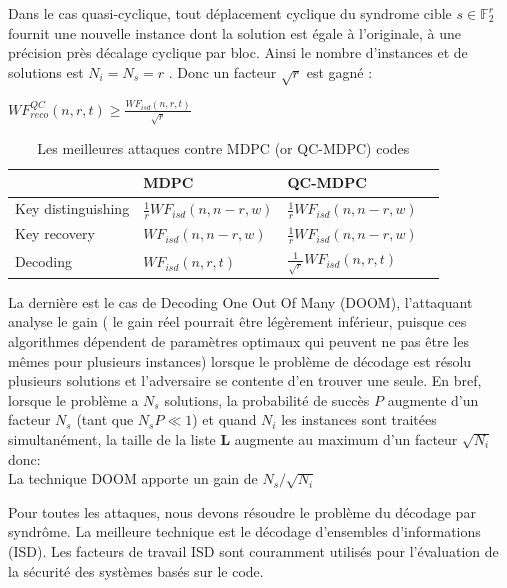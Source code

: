 \documentclass[12pt,openany]{report}
\begin{document}
\begin{itemize}
Dans le cas quasi-cyclique, tout déplacement cyclique du syndrome cible  $  s \in \mathbb{F}_{2}^{r}  $
fournit une nouvelle instance dont la solution est égale à l'originale, à une précision près
décalage cyclique par bloc. Ainsi le nombre d'instances et de solutions est
$N_i = N_s = r $ . Donc un facteur $ \sqrt{r} $ est gagné :
\begin{center}

{\large

$ WF_{reco}^{QC}(n,r,t)\geq \frac{WF_{isd}(n,r,t)}{ \sqrt{r}}  $}
\hspace{0.3cm}
\end{center}
\begin{table}
\centering
\begin{tabular}{|R{5cm}||C{4cm}|L{4cm}|L{4.5cm}|}
\hline  & MDPC &  QC-MDPC \\
\hline  Key distinguishing  &$ \frac{1}{r}WF_{isd}(n,n-r,w) $ & $\frac{1}{r}WF_{isd}(n,n-r,w) $  \\
\hline 
Key recovery  &$ WF_{isd}(n,n-r,w) $ & $\frac{1}{r}WF_{isd}(n,n-r,w) $  \\
Decoding  &$ WF_{isd}(n,r,t) $ & $\frac{1}{\sqrt{r}}WF_{isd}(n,r,t) $  \\
\hline

\end{tabular}
\caption{Les meilleures attaques contre MDPC (or QC-MDPC) codes }
\label{tab5}
\end{table}

\end{itemize}
\hspace{1.2cm}
La dernière est le cas de Decoding One Out Of Many (DOOM), l'attaquant analyse le gain ( le gain réel pourrait être légèrement inférieur, puisque ces algorithmes dépendent de
paramètres optimaux qui peuvent ne pas être les mêmes pour plusieurs instances) lorsque le problème de décodage est résolu
plusieurs solutions et l’adversaire se contente d’en trouver une seule.
En bref, lorsque le problème a $N_s$ solutions, la probabilité de succès $\mathit{P}$
augmente d'un facteur $N_s$ (tant que $N_s P \ll 1 $)
et quand $N_i  $ les instances sont traitées
simultanément, la taille de la liste $\mathbf{L}$ augmente au maximum d'un facteur $\sqrt{N_i}  $ donc:\\
La technique DOOM apporte un gain de $N_s / \sqrt{N_i}$ 

Pour toutes les attaques, nous devons résoudre le problème du décodage par syndrôme. La meilleure technique est le décodage d'ensembles d'informations (ISD).
Les facteurs de travail ISD sont couramment utilisés pour l'évaluation de la sécurité des systèmes basés sur le code.
\end{document}
